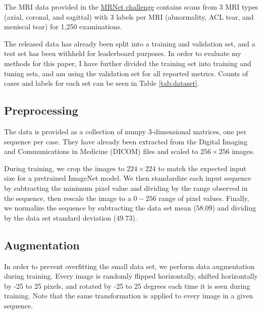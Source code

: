 \documentclass[10pt,twocolumn,letterpaper]{article}
\begin{document}
The MRI data provided in the \href{https://stanfordmlgroup.github.io/competitions/mrnet/}{MRNet challenge} contains scans from 3 MRI types (axial, coronal, and sagittal) with 3 labels per MRI (abnormality, ACL tear, and meniscal tear) for 1,250 examinations.

The released data has already been split into a training and validation set, and a test set has been withheld for leaderboard purposes. In order to evaluate my methods for this paper, I have further divided the training set into training and tuning sets, and am using the validation set for all reported metrics. Counts of cases and labels for each set can be seen in Table \ref{tab:dataset}.

\subsection{Preprocessing}

The data is provided as a collection of numpy\cite{numpy} 3-dimensional matrices, one per sequence per case. They have already been extracted from the Digital Imaging and Communications in Medicine (DICOM) files and scaled to $256 \times 256$ images.

During training, we crop the images to $224 \times 224$ to match the expected input size for a pretrained ImageNet model. We then standardize each input sequence by subtracting the minimum pixel value and dividing by the range observed in the sequence, then rescale the image to a $0-256$ range of pixel values. Finally, we normalize the sequence by subtracting the data set mean ($58.09$) and dividing by the data set standard deviation ($49.73$).

\subsection{Augmentation}

In order to prevent overfitting the small data set, we perform data augmentation during training. Every image is randomly flipped horizontally, shifted horizontally by -25 to 25 pixels, and rotated by -25 to 25 degrees each time it is seen during training. Note that the same transformation is applied to every image in a given sequence.
\end{document}
